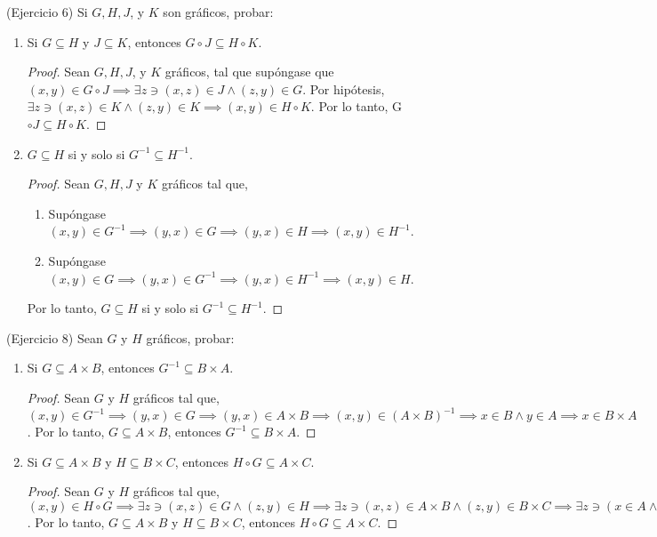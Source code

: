 \begin{problema}(Ejercicio 6)
	Si $G, H, J$, y $K$  son gráficos, probar: 
	\begin{enumerate}
		\item Si $G \subseteq H$ y $J \subseteq K$, entonces $G \circ J \subseteq H \circ K$. 
		\begin{proof}
			Sean $G, H, J$, y $K$  gráficos, tal que supóngase que $(x,y)\in G\circ J\implies \exists z\ni (x,z)\in J\wedge (z,y)\in G$. Por hipótesis, $\exists z \ni (x,z)\in K\wedge (z,y)\in K\implies (x,y)\in H\circ K$. Por lo tanto, G $\circ J \subseteq H \circ K$. 
		\end{proof}
		\item $G \subseteq H$ si y solo si $G^{-1} \subseteq H^{-1}$.
		\begin{proof}
			Sean $G,H,J$ y $K$ gráficos tal que, 
			\begin{enumerate}
				\item [($\implies$)] Supóngase $(x,y) \in G^{-1}\implies (y,x)\in G\implies (y,x) \in H\implies (x,y)\in H^{-1}$.
				\item [($\impliedby$)] Supóngase $(x,y) \in G\implies (y,x)\in G^{-1}\implies (y,x) \in H^{-1}\implies (x,y)\in H$.
			\end{enumerate}
		Por lo tanto, $G \subseteq H$ si y solo si $G^{-1} \subseteq H^{-1}$. 
		\end{proof}
	\end{enumerate}
\end{problema}


\begin{problema}(Ejercicio 8)
	Sean $G$ y $H$ gráficos, probar:
	\begin{enumerate}
	\item  Si $G \subseteq A \times B$, entonces $G^{-1} \subseteq B \times A$.
	\begin{proof}
		Sean $G$ y $H$ gráficos tal que, $(x,y)\in G^{-1} \implies (y,x)\in G\implies (y,x)\in A\times B \implies (x,y)\in (A\times B)^{-1}\implies x\in B\wedge y\in A\implies x \in B\times A$. Por lo tanto, $G \subseteq A \times B$, entonces $G^{-1} \subseteq B \times A$.
	\end{proof}
	\item  Si $G \subseteq A \times B$ y $H \subseteq B \times C$, entonces $H \circ G \subseteq A \times C$.
	\begin{proof}
		Sean $G$ y $H$ gráficos tal que, $(x,y)\in H\circ G \implies\exists z\ni  (x,z)\in G\wedge  (z,y)\in H\implies \exists z \ni (x,z)\in A\times B\wedge (z,y)\in B\times C\implies\exists z \ni  (x\in A\wedge z\in B)\wedge (z\in B\wedge y\in C)\implies \exists z\ni  (z\in B)\wedge (x\in A\wedge y\in C)\implies (x,y)\in A\times C$. Por lo tanto, $G \subseteq A \times B$ y $H \subseteq B \times C$, entonces $H \circ G \subseteq A \times C$.
	\end{proof}
	\end{enumerate}
\end{problema}

